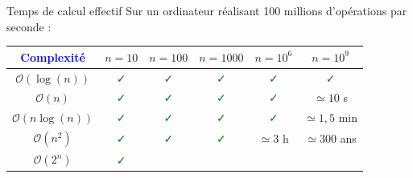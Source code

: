 \documentclass[10pt]{beamer}
\begin{document}
\begin{frame}[fragile]{\Ctitle}{\stitle}
	\begin{block}{Temps de calcul effectif}
		Sur un ordinateur réalisant 100 millions d'opérations par seconde :
		\renewcommand{\arraystretch}{1.3}
		\begin{tabular}{|c|c|c|c|c|c|}
			\hline
			\textcolor{blue}{Complexité} & $n=10$                      & $n=100$                     & $n=1000$                    & $n=10^6$                    & $n=10^9$                    \\
			\hline
			$\mathcal{O}(\log(n))$       & \textcolor{green}{\faCheck} & \textcolor{green}{\faCheck} & \textcolor{green}{\faCheck} & \textcolor{green}{\faCheck} & \textcolor{green}{\faCheck} \\
			\hline
			$\mathcal{O}(n)$             & \textcolor{green}{\faCheck} & \textcolor{green}{\faCheck} & \textcolor{green}{\faCheck} & \textcolor{green}{\faCheck} & $\simeq 10$ s               \\
			\hline
			$\mathcal{O}(n\log(n))$      & \textcolor{green}{\faCheck} & \textcolor{green}{\faCheck} & \textcolor{green}{\faCheck} & \textcolor{green}{\faCheck} & $\simeq 1,5$ min            \\
			\hline
			$\mathcal{O}(n^2)$           & \textcolor{green}{\faCheck} & \textcolor{green}{\faCheck} & \textcolor{green}{\faCheck} & $\simeq 3$ h                & $\simeq 300$ ans            \\
			\hline
			$\mathcal{O}(2^n)$           & \textcolor{green}{\faCheck} & \textcolor{red}{\faTimes}   & \textcolor{red}{\faTimes}   & \textcolor{red}{\faTimes}   & \textcolor{red}{\faTimes}   \\
			\hline
		\end{tabular}
	\end{block}
\end{frame}
\end{document}
